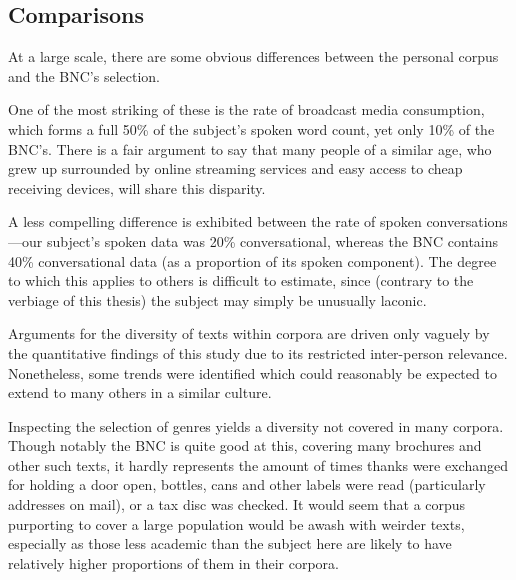 \subsection{Comparisons}



At a large scale, there are some obvious differences between the personal corpus and the BNC's selection.

One of the most striking of these is the rate of broadcast media consumption, which forms a full 50\% of the subject's spoken word count, yet only 10\% of the BNC's.  There is a fair argument to say that many people of a similar age, who grew up surrounded by online streaming services and easy access to cheap receiving devices, will share this disparity.

A less compelling difference is exhibited between the rate of spoken conversations---our subject's spoken data was 20\% conversational, whereas the BNC contains 40\% conversational data (as a proportion of its spoken component).  The degree to which this applies to others is difficult to estimate, since (contrary to the verbiage of this thesis) the subject may simply be unusually laconic.



Arguments for the diversity of texts within corpora are driven only vaguely by the quantitative findings of this study due to its restricted inter-person relevance.  Nonetheless, some trends were identified which could reasonably be expected to extend to many others in a similar culture.

Inspecting the selection of genres yields a diversity not covered in many corpora.  Though notably the BNC is quite good at this, covering many brochures and other such texts, it hardly represents the amount of times thanks were exchanged for holding a door open, bottles, cans and other labels were read (particularly addresses on mail), or a tax disc was checked.  It would seem that a corpus purporting to cover a large population would be awash with weirder texts, especially as those less academic than the subject here are likely to have relatively higher proportions of them in their corpora.

